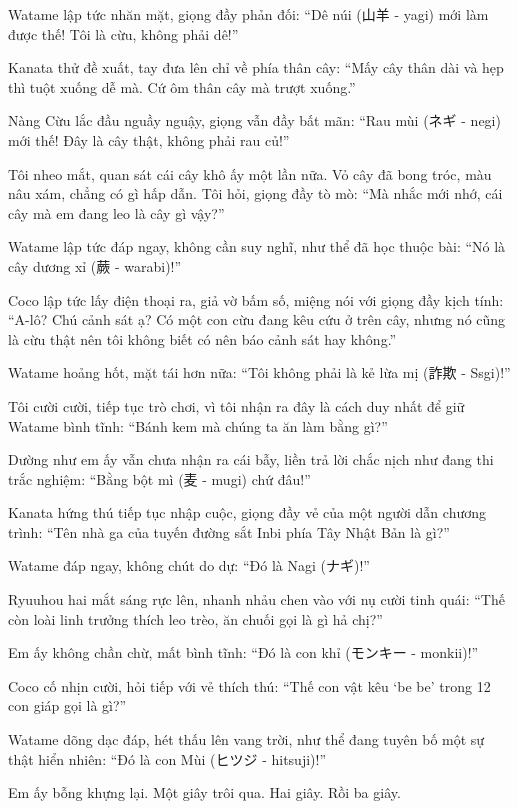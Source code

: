 \documentclass[../main.tex]{subfiles}
\begin{document}
Watame lập tức nhăn mặt, giọng đầy phản đối: ``Dê núi (山羊 - yagi) mới làm được thế! Tôi là cừu, không phải dê!''

Kanata thử đề xuất, tay đưa lên chỉ về phía thân cây: ``Mấy cây thân dài và hẹp thì tuột xuống dễ mà. Cứ ôm thân cây mà trượt xuống.''

Nàng Cừu lắc đầu nguầy nguậy, giọng vẫn đầy bất mãn: ``Rau mùi (ネギ - negi) mới thế! Đây là cây thật, không phải rau củ!''

Tôi nheo mắt, quan sát cái cây khô ấy một lần nữa. Vỏ cây đã bong tróc, màu nâu xám, chẳng có gì hấp dẫn. Tôi hỏi, giọng đầy tò mò: ``Mà nhắc mới nhớ, cái cây mà em đang leo là cây gì vậy?''

Watame lập tức đáp ngay, không cần suy nghĩ, như thể đã học thuộc bài: ``Nó là cây dương xỉ (蕨 - warabi)!''

Coco lập tức lấy điện thoại ra, giả vờ bấm số, miệng nói với giọng đầy kịch tính: ``A-lô? Chú cảnh sát ạ? Có một con cừu đang kêu cứu ở trên cây, nhưng nó cũng là cừu thật nên tôi không biết có nên báo cảnh sát hay không.''

Watame hoảng hốt, mặt tái hơn nữa: ``Tôi không phải là kẻ lừa mị (詐欺 - Ssgi)!''

Tôi cười cười, tiếp tục trò chơi, vì tôi nhận ra đây là cách duy nhất để giữ Watame bình tĩnh: ``Bánh kem mà chúng ta ăn làm bằng gì?''

Dường như em ấy vẫn chưa nhận ra cái bẫy, liền trả lời chắc nịch như đang thi trắc nghiệm: ``Bằng bột mì (麦 - mugi) chứ đâu!''

Kanata hứng thú tiếp tục nhập cuộc, giọng đầy vẻ của một người dẫn chương trình: ``Tên nhà ga của tuyến đường sắt Inbi phía Tây Nhật Bản là gì?''

Watame đáp ngay, không chút do dự: ``Đó là Nagi (ナギ)!''

Ryuuhou hai mắt sáng rực lên, nhanh nhảu chen vào với nụ cười tinh quái: ``Thế còn loài linh trưởng thích leo trèo, ăn chuối gọi là gì hả chị?''

Em ấy không chần chừ, mất bình tĩnh: ``Đó là con khỉ (モンキー - monkii)!''

Coco cố nhịn cười, hỏi tiếp với vẻ thích thú: ``Thế con vật kêu `be be' trong 12 con giáp gọi là gì?''

Watame dõng dạc đáp, hét thấu lên vang trời, như thể đang tuyên bố một sự thật hiển nhiên: ``Đó là con Mùi (ヒツジ - hitsuji)!''

Em ấy bỗng khựng lại. Một giây trôi qua. Hai giây. Rồi ba giây.
\end{document}
